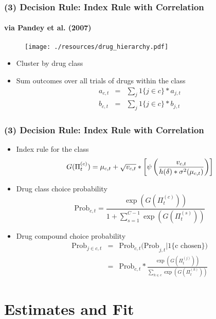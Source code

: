 \begin{frame}
\frametitle{(3) Decision Rule: Index Rule with Correlation} %
\framesubtitle{via Pandey et al. (2007)}

\begin{figure}[h!]
\centering\texttt{[image: ./resources/drug\_hierarchy.pdf]}
\end{figure}

\begin{itemize}
\item Cluster by drug class

\item Sum outcomes over all trials of drugs within the class 
\begin{eqnarray*}
a_{c,t} &=&\sum_{j}1\{j\in c\} \ast a_{j,t} \\
b_{c,t} &=&\sum_{j}1\{j\in c\} \ast b_{j,t}
\end{eqnarray*}
\end{itemize}
\end{frame}


\begin{frame}
\frametitle{(3) Decision Rule: Index Rule with Correlation}

\begin{itemize}
\item Index rule for the class 
\[
G(\Pi _{t}^{(c)})=\mu _{c,t}+\sqrt{v_{c,t}}*\left[\psi \left( \frac{v_{c,t}}{%
h(\delta)\ast \sigma ^{2}(\mu _{c,t})}\right)\right]
\]

\item Drug class choice probability 
\[
\text{Prob}_{c,t}=\frac{\exp (G(\Pi _{t}^{(c)}))}{1+\sum_{s=1}^{C-1}\exp
(G(\Pi _{t}^{(s)}))}
\]

\item Drug compound choice probability 
\begin{eqnarray*}
\text{Prob}_{j\in c,t} &=&\text{Prob}_{c,t}\text{(Prob}_{j,t}|\text{1\{c
chosen\})} \\
&=&\text{Prob}_{c,t}\ast \frac{\exp (G(\Pi _{t}^{(j)}))}{\sum_{k\in c}\exp
(G(\Pi _{t}^{(k)}))}
\end{eqnarray*}
\end{itemize}
\end{frame}

\section{Estimates and Fit}


